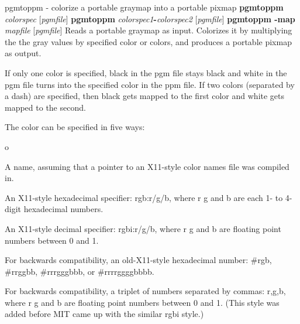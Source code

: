 %

\newpage
%

pgmtoppm - colorize a portable graymap into a portable pixmap
{\bf pgmtoppm}
{\it colorspec}
{\rm [}{\it pgmfile}{\rm ]}
\nwl
{\bf pgmtoppm}
{\it colorspec1}{\bf -}{\it colorspec2}
{\rm [}{\it pgmfile}{\rm ]}
\nwl
{\bf pgmtoppm -map}
{\it mapfile}
{\rm [}{\it pgmfile}{\rm ]}
Reads a portable graymap as input.
Colorizes it by multiplying the the gray values by specified color or colors,
and produces a portable pixmap as output.
\par
If only one color is specified, black in the pgm file stays black and
white in the pgm file turns into the specified color in the ppm file.
If two colors (separated by a dash) are specified, then black gets mapped
to the first color and white gets mapped to the second.
\par
The color can be specified in five ways:
\begin{TPlist}{o}
\item[{o}]
A name, assuming
that a pointer to an X11-style color names file was compiled in.
\item[{o}]
An X11-style hexadecimal specifier: rgb:r/g/b, where r g and b are
each 1- to 4-digit hexadecimal numbers.
\item[{o}]
An X11-style decimal specifier: rgbi:r/g/b, where r g and b are
floating point numbers between 0 and 1.
\item[{o}]
For backwards compatibility, an old-X11-style hexadecimal
number: \#rgb, \#rrggbb, \#rrrgggbbb, or \#rrrrggggbbbb.
\item[{o}]
For backwards compatibility, a triplet of numbers
separated by commas: r,g,b, where r g and b are
floating point numbers between 0 and 1.
(This style was added before MIT came up with the similar rgbi style.)
\end{TPlist}

